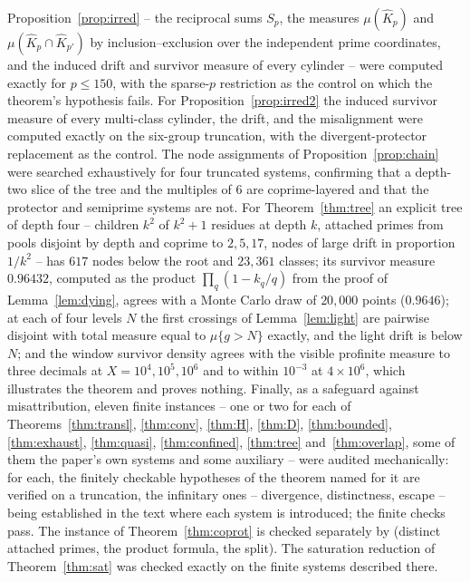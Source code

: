 \documentclass[11pt]{article}
\theoremstyle{plain}
\theoremstyle{definition}
\newcommand{\Kh}{\widehat{K}}
\begin{document}
{Proposition~\ref{prop:irred} -- the reciprocal sums $S_p$, the
measures $\mu(\Kh_p)$ and $\mu(\Kh_p\cap \Kh_{p'})$ by
inclusion--exclusion over the independent prime coordinates,
and the induced drift and survivor measure of every cylinder --
were computed exactly for $p\le150$, with the sparse-$p$
restriction as the control on which the theorem's hypothesis
fails.  For Proposition~\ref{prop:irred2} the induced survivor
measure of every multi-class cylinder, the drift, and the
misalignment were computed exactly on the six-group truncation,
with the divergent-protector replacement as the control.  The
node assignments of Proposition~\ref{prop:chain} were searched
exhaustively for four truncated systems, confirming that a
depth-two slice of the tree and the multiples of $6$ are
coprime-layered and that the protector and semiprime systems
are not.  For
Theorem~\ref{thm:tree} an explicit tree of depth four --
children $k^2$ of $k^2+1$ residues at depth $k$, attached primes
from pools disjoint by depth and coprime to $2,5,17$, nodes of large drift in proportion $1/k^2$ -- has $617$ nodes below the root and $23{,}361$
classes; its survivor measure $0.96432$, computed as the product
$\prod_q(1-k_q/q)$ from the proof of Lemma~\ref{lem:dying}, agrees with a Monte Carlo
draw of $20{,}000$ points ($0.9646$); at each of four levels
$N$ the first crossings of Lemma~\ref{lem:light} are pairwise
disjoint with total measure equal to $\mu\{g>N\}$ exactly, and the light drift is below $N$; and the window
survivor density agrees with the visible profinite measure to
three decimals at $X=10^4,10^5,10^6$ and to within $10^{-3}$ at
$4\times10^6$, which
illustrates the theorem and proves nothing.  Finally, as a safeguard against
misattribution, eleven finite instances -- one or two for each
of Theorems~\ref{thm:transl}, \ref{thm:conv}, \ref{thm:H},
\ref{thm:D}, \ref{thm:bounded}, \ref{thm:exhaust},
\ref{thm:quasi}, \ref{thm:confined}, \ref{thm:tree}
and~\ref{thm:overlap}, some of them the paper's own systems and
some auxiliary -- were audited mechanically: for each, the
finitely checkable hypotheses of the theorem named for it are
verified on a truncation, the infinitary ones -- divergence,
distinctness, escape -- being established in the text where each
system is introduced; the finite checks pass.  The instance of
Theorem~\ref{thm:coprot} is checked separately by
 (distinct attached primes,
the product formula, the split).  The saturation reduction of
Theorem~\ref{thm:sat} was checked exactly on the finite systems
described there.\par}
\end{document}
